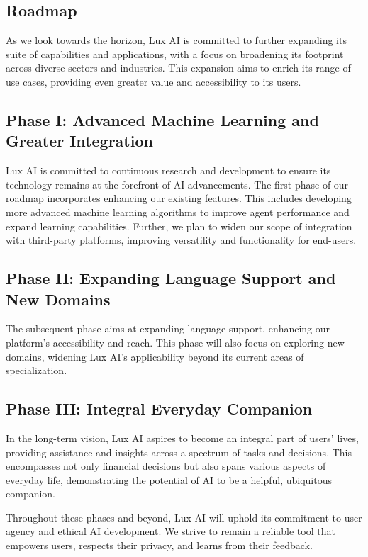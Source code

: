 \documentclass[11pt]{article}
\begin{document}
\subsection{Roadmap}

As we look towards the horizon, Lux AI is committed to further expanding its suite of capabilities and applications, with a focus on broadening its footprint across diverse sectors and industries. This expansion aims to enrich its range of use cases, providing even greater value and accessibility to its users.


\subsection{Phase I: Advanced Machine Learning and Greater Integration}

Lux AI is committed to continuous research and development to ensure its technology remains at the forefront of AI advancements. The first phase of our roadmap incorporates enhancing our existing features. This includes developing more advanced machine learning algorithms to improve agent performance and expand learning capabilities. Further, we plan to widen our scope of integration with third-party platforms, improving versatility and functionality for end-users.


\subsection{Phase II: Expanding Language Support and New Domains}

The subsequent phase aims at expanding language support, enhancing our platform's accessibility and reach. This phase will also focus on exploring new domains, widening Lux AI's applicability beyond its current areas of specialization.


\subsection{Phase III: Integral Everyday Companion}

In the long-term vision, Lux AI aspires to become an integral part of users' lives, providing assistance and insights across a spectrum of tasks and decisions. This encompasses not only financial decisions but also spans various aspects of everyday life, demonstrating the potential of AI to be a helpful, ubiquitous companion.


Throughout these phases and beyond, Lux AI will uphold its commitment to user agency and ethical AI development. We strive to remain a reliable tool that empowers users, respects their privacy, and learns from their feedback.
\end{document}
